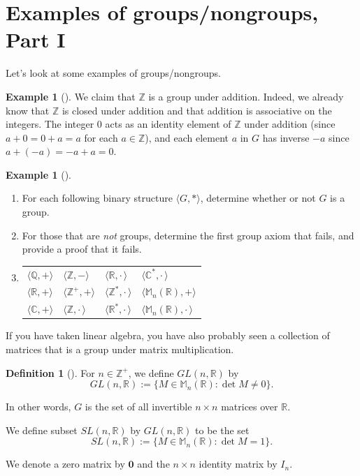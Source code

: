 \documentclass[10pt,]{book}
\theoremstyle{plain}
\theoremstyle{definition}
\newtheorem{definition}[theorem]{Definition}
\theoremstyle{definition}
\theoremstyle{definition}
\newtheorem{example}[theorem]{Example}
\theoremstyle{definition}
\numberwithin{equation}{section}
\def\Z{\mathbb{Z}}
\def\R{\mathbb{R}}
\def\Q{\mathbb{Q}}
\def\C{\mathbb{C}}
\def\M{\mathbb{M}}
\def\0{\mathbf 0}
\begin{document}
\section[{Examples of groups/nongroups, Part I}]{Examples of groups/nongroups, Part I}\label{section-6}
Let's look at some examples of groups/nongroups.%
\begin{example}[]\label{example-10}
We claim that \(\Z\) is a group under addition. Indeed, we already know that \(\Z\) is closed under addition and that addition is associative on the integers. The integer \(0\) acts as an identity element of \(\Z\) under addition (since \(a+0=0+a=a\) for each \(a\in
\Z\)), and each element \(a\) in \(G\) has inverse \(-a\) since \(a+(-a)=-a+a=0\).%
\end{example}
\begin{example}[]\label{example-11}
\leavevmode%
\begin{enumerate}
\item\hypertarget{li-79}{}For each following binary structure \(\langle G,*\rangle\), determine whether or not \(G\) is a group.%
\item\hypertarget{li-80}{}For those that are \emph{not} groups, determine the first group axiom  that fails, and provide a proof that it fails.%
\item\hypertarget{li-81}{}\begin{tabular}{llll}
\(\langle \Q,+\rangle\)&\(\langle \Z,-\rangle\)&\(\langle \R,\cdot\,\rangle\)&\(\langle \C^*,\cdot\, \rangle\)\tabularnewline[0pt]
\(\langle \R,+\rangle\)&\(\langle \Z^+,+\rangle\)&\(\langle \Z^*,\cdot\,\rangle\)&\(\langle \M_n(\R),+\rangle\)\tabularnewline[0pt]
\(\langle \C,+\rangle\)&\(\langle \Z, \cdot\,\rangle\)&\(\langle \R^*,\cdot\, \rangle\)&\(\langle \M_n(\R),\cdot\, \rangle\)
\end{tabular}
%
\end{enumerate}
\end{example}
If you have taken linear algebra, you have also probably seen a collection of matrices that is a group under matrix multiplication.%
\begin{definition}[{}]\label{definition-19}
For \(n\in \Z^+\), we define \(GL(n,\R)\) by%
\begin{equation*}
GL(n,\R):=\{M\in \M_n(\R):\det M \neq 0\}.
\end{equation*}
%
\par
In other words, \(G\) is the set of all invertible \(n\times n\) matrices over \(\R\).%
\par
We  define subset \(SL(n,\R)\) by \(GL(n,\R)\) to be the set%
\begin{equation*}
SL(n,\R):=\{M\in \M_n(\R):\det M =1\}.
\end{equation*}
%
\par
We denote a zero matrix by  \(\0\) and the  \(n\times n\) identity matrix by  \(I_n\).%
\end{definition}
\end{document}
